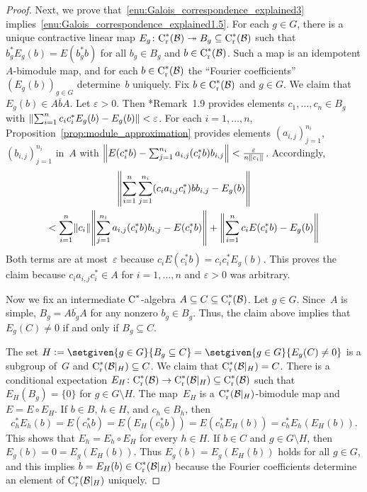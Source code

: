 \documentclass[a4paper]{amsart}
\theoremstyle{plain}
\theoremstyle{definition}
\theoremstyle{remark}
\numberwithin{theorem}{section}
\numberwithin{equation}{section}
\newcommand*{\nb}{\nobreakdash}
\newcommand*{\red}{\mathrm{r}}%
\newcommand*{\Cst}{\textup C^*}%
\newcommand*{\B}{\mathcal B}%
\newcommand*{\defeq}{\mathrel{\vcentcolon=}}%
\DeclarePairedDelimiter{\norm}{\lVert}{\rVert}%
\newcommand*{\onto}{\twoheadrightarrow}
\begin{document}
\begin{proof}
  Next, we prove that~\ref{enu:Galois_correspondence_explained3}
  implies~\ref{enu:Galois_correspondence_explained1.5}.
  For each \(g\in G\), there is a unique contractive linear map
  \(E_g\colon \Cst_\red(\B)\onto B_g\subseteq \Cst_\red(\B)\) such
  that \(b_g^*E_g(b)=E(b_g^*b)\) for all \(b_g\in B_g\) and \(b\in
  \Cst_\red(\B)\).
  Such a map is an idempotent \(A\)\nb-bimodule map,
  and for each \(b\in  \Cst_\red(\B)\) the ``Fourier coefficients''
  \((E_g(b))_{g\in G}\) determine~\(b\) uniquely.
  Fix \(b\in  \Cst_\red(\B)\) and \(g\in G\).
  We claim that \(E_g(b)\in \overline{A b A}\).
  Let \(\varepsilon >0\).
  Then \cite{Brown-Mingo-Shen:Quasi_multipliers}*{Remark~1.9} provides
  elements \(c_1,\dotsc,c_n\in B_g\) with \(\norm*{\sum_{i=1}^n c_i
    c_i^*E_g(b)- E_g(b)}< \varepsilon\).
  For each \(i=1,\dotsc, n\),
  Proposition~\ref{prop:module_approximation} provides elements
  \((a_{i,j})_{j=1}^{n_i}\), \((b_{i,j})_{j=1}^{n_i}\) in~\(A\) with
  \(\norm*{E(c_i^*b)- \sum_{j=1}^{n_i} a_{i,j}(c_i^*b)b_{i,j}}<
  \frac{\varepsilon}{n\norm{c_i}}\).
  Accordingly,
  \begin{multline*}
    \norm*{\sum_{i=1}^n\sum_{j=1}^{n_i} (c_i a_{i,j}c_i^*)b b_{i,j}-
      E_g(b)}\\
    <
    \sum_{i=1}^n \norm{c_i} \norm*{\sum_{j=1}^{n_i}  a_{i,j}(c_i^*b) b_{i,j}- E(c_i^*b)}
    +\norm*{\sum_{i=1}^n c_i E(c_i^*b)- E_g(b)}
  \end{multline*}
  Both terms are at most~\(\varepsilon\) because \(c_i E(c_i^*b) = c_i
  c_i^* E_g(b)\).
  This proves the claim because \(c_i a_{i,j}c_i^*\in A\) for
  \(i=1,\dotsc,n\) and \(\varepsilon>0\) was arbitrary.

  Now we fix an intermediate \(\Cst\)\nb-algebra \(A\subseteq
  C\subseteq \Cst_\red(\B)\).
  Let \(g\in G\).
  Since~\(A\) is simple, \(B_g=\overline{Ab_g A}\) for any nonzero
  \(b_g\in B_g\).
  Thus, the claim above implies that \(E_g(C)\neq 0\) if and only if
  \(B_g\subseteq C\).

  The set \(H\defeq\setgiven{g\in G}{B_g\subseteq C}=\setgiven{g\in
    G}{ E_g(C)\neq 0}\) is a subgroup of~\(G\) and
  \(\Cst_\red(\B|_H)\subseteq C\).
  We claim that \(\Cst_\red(\B|_H)= C\).
  There is a conditional expectation \(E_H\colon  \Cst_\red(\B)\to
  \Cst_\red(\B|_H)\subseteq \Cst_\red(\B)\) such that
  \(E_H(B_g)=\{0\}\) for \(g\in G\setminus H\).
  The map~\(E_H\) is a \(\Cst_\red(\B|_H)\)-bimodule map and
  \(E=E\circ E_H\).
  If \(b\in B\), \(h\in H\), and \(c_h\in B_h\),  then
  \[
    c_h^*E_h(b)
    = E(c_h^*b)
    = E(E_H(c_h^*b))
    = E(c_h^* E_H(b))
    = c_h^* E_h(E_H(b)).
  \]
  This shows that \(E_h=E_h\circ E_H\) for every \(h\in H\).
  If \(b\in C\) and \(g\in G\setminus H\), then
  \(E_g(b)=0=E_g(E_H(b))\).
  Thus \(E_g(b)=E_g(E_H(b))\) holds for all \(g\in G\), and this
  implies \(b=E_H(b)\in \Cst_\red(\B|_H)\) because the Fourier
  coefficients determine an element of \(\Cst_\red(\B|_H)\) uniquely.
\end{proof}
\end{document}
